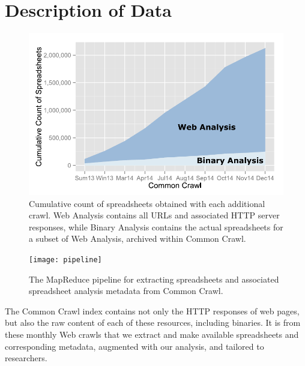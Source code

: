 \documentclass[conference]{IEEEtran}
\begin{document}
\section{Description of Data}

\begin{figure}[!t]
\centering
% 
\includegraphics[width=0.85\columnwidth]{figures/stack}
\caption{Cumulative count of spreadsheets obtained with each additional crawl. Web Analysis contains all URLs and associated HTTP server responses, while Binary Analysis contains the actual spreadsheets for a subset of Web Analysis, archived within Common Crawl.\label{fig:rplot}}
\end{figure}

\begin{figure}[!t]
\centering
\texttt{[image: pipeline]}
\caption{The MapReduce pipeline for extracting spreadsheets and associated spreadsheet analysis metadata from Common Crawl.\label{fig:mrpipeline}}
\end{figure}

The Common Crawl index contains not only the HTTP responses of web pages, but also the raw content of each of these resources, including binaries. It is from these monthly Web crawls that we extract and make available spreadsheets and corresponding metadata, augmented with our analysis, and tailored to researchers.

\end{document}
